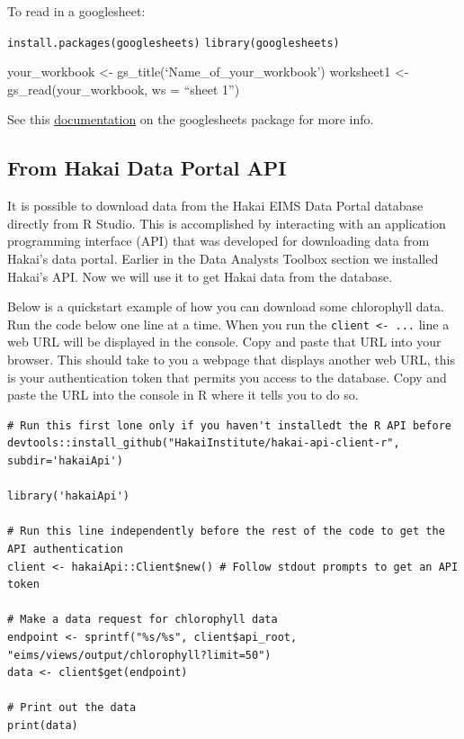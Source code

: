 \documentclass[]{book}
\begin{document}
To read in a googlesheet:

\texttt{install.packages(\textquotesingle{}googlesheets\textquotesingle{})}
\texttt{library(googlesheets)}

your\_workbook \textless{}- gs\_title(`Name\_of\_your\_workbook')
worksheet1 \textless{}- gs\_read(your\_workbook, ws = ``sheet 1'')

See this
\href{https://cran.r-project.org/web/packages/googlesheets/vignettes/basic-usage.html}{documentation}
on the googlesheets package for more info.

\subsection{From Hakai Data Portal
API}\label{from-hakai-data-portal-api}

It is possible to download data from the Hakai EIMS Data Portal database
directly from R Studio. This is accomplished by interacting with an
application programming interface (API) that was developed for
downloading data from Hakai's data portal. Earlier in the Data Analysts
Toolbox section we installed Hakai's API. Now we will use it to get
Hakai data from the database.

Below is a quickstart example of how you can download some chlorophyll
data. Run the code below one line at a time. When you run the
\texttt{client\ \textless{}-\ ...} line a web URL will be displayed in
the console. Copy and paste that URL into your browser. This should take
to you a webpage that displays another web URL, this is your
authentication token that permits you access to the database. Copy and
paste the URL into the console in R where it tells you to do so.

\begin{verbatim}
# Run this first lone only if you haven't installedt the R API before
devtools::install_github("HakaiInstitute/hakai-api-client-r", subdir='hakaiApi')

library('hakaiApi')

# Run this line independently before the rest of the code to get the API authentication
client <- hakaiApi::Client$new() # Follow stdout prompts to get an API token

# Make a data request for chlorophyll data
endpoint <- sprintf("%s/%s", client$api_root, "eims/views/output/chlorophyll?limit=50")
data <- client$get(endpoint)

# Print out the data
print(data)
\end{verbatim}
\end{document}
